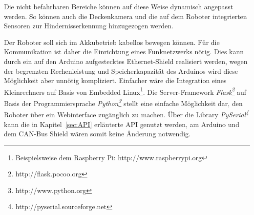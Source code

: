 Die nicht befahrbaren Bereiche können auf diese Weise dynamisch angepasst werden. So können auch die Deckenkamera und die auf dem Roboter integrierten Sensoren zur Hindernisserkennung hinzugezogen werden.

Der Roboter soll sich im Akkubetrieb kabellos bewegen können. Für die Kommunikation ist daher die Einrichtung eines Funknetzwerks nötig. Dies kann durch ein auf den Arduino aufgestecktes Ethernet-Shield realisiert werden, wegen der begrenzten Rechenleistung und Speicherkapazität des Arduinos wird diese Möglichkeit aber unnötig kompliziert.
Einfacher wäre die Integration eines Kleinrechners auf Basis von Embedded Linux\footnote{Beispielsweise dem Raspberry Pi: http://www.raspberrypi.org}. Die Server-Framework \emph{Flask\footnote{http://flask.pocoo.org}} auf Basis der Programmiersprache \emph{Python\footnote{http://www.python.org}} stellt eine einfache Möglichkeit dar, den Roboter über ein Webinterface zugänglich zu machen. Über die Library \emph{PySerial\footnote{http://pyserial.sourceforge.net}} kann die in Kapitel~\ref{sec:API} erläuterte API genutzt werden, am Arduino und dem CAN-Bus Shield wären somit keine Änderung notwendig.


